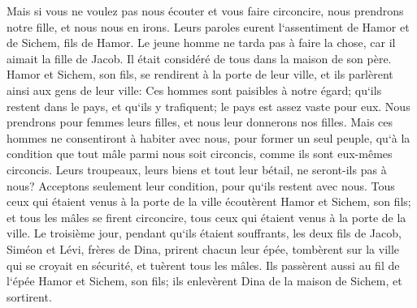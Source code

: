 \verse Mais si vous ne voulez pas nous écouter et vous faire circoncire, nous prendrons notre fille, et nous nous en irons. 
\verse Leurs paroles eurent l`assentiment de Hamor et de Sichem, fils de Hamor. 
\verse Le jeune homme ne tarda pas à faire la chose, car il aimait la fille de Jacob. Il était considéré de tous dans la maison de son père. 
\verse Hamor et Sichem, son fils, se rendirent à la porte de leur ville, et ils parlèrent ainsi aux gens de leur ville: 
\verse Ces hommes sont paisibles à notre égard; qu`ils restent dans le pays, et qu`ils y trafiquent; le pays est assez vaste pour eux. Nous prendrons pour femmes leurs filles, et nous leur donnerons nos filles. 
\verse Mais ces hommes ne consentiront à habiter avec nous, pour former un seul peuple, qu`à la condition que tout mâle parmi nous soit circoncis, comme ils sont eux-mêmes circoncis. 
\verse Leurs troupeaux, leurs biens et tout leur bétail, ne seront-ils pas à nous? Acceptons seulement leur condition, pour qu`ils restent avec nous. 
\verse Tous ceux qui étaient venus à la porte de la ville écoutèrent Hamor et Sichem, son fils; et tous les mâles se firent circoncire, tous ceux qui étaient venus à la porte de la ville. 
\verse Le troisième jour, pendant qu`ils étaient souffrants, les deux fils de Jacob, Siméon et Lévi, frères de Dina, prirent chacun leur épée, tombèrent sur la ville qui se croyait en sécurité, et tuèrent tous les mâles. 
\verse Ils passèrent aussi au fil de l`épée Hamor et Sichem, son fils; ils enlevèrent Dina de la maison de Sichem, et sortirent. 
